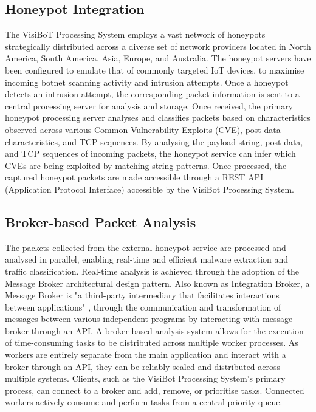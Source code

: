 \subsection{Honeypot Integration}

The VisiBoT Processing System employs a vast network of honeypots strategically distributed across a diverse set of network providers located in North America, South America, Asia, Europe, and Australia. The honeypot servers have been configured to emulate that of commonly targeted IoT devices, to maximise incoming botnet scanning activity and intrusion attempts. Once a honeypot detects an intrusion attempt, the corresponding packet information is sent to a central processing server for analysis and storage. Once received, the primary honeypot processing server analyses and classifies packets based on characteristics observed across various Common Vulnerability Exploits (CVE), post-data characteristics, and TCP sequences. By analysing the payload string, post data, and TCP sequences of incoming packets, the honeypot service can infer which CVEs are being exploited by matching string patterns. Once processed, the captured honeypot packets are made accessible through a REST API (Application Protocol Interface) accessible by the VisiBot Processing System.

\subsection{Broker-based Packet Analysis}

The packets collected from the external honeypot service are processed and analysed in parallel, enabling real-time and efficient malware extraction and traffic classification. Real-time analysis is achieved through the adoption of the Message Broker architectural design pattern. Also known as Integration Broker, a Message Broker is "a third-party intermediary that facilitates interactions between applications" \citep{IBDefinition}, through the communication and transformation of messages between various independent programs by interacting with message broker through an API. A broker-based analysis system allows for the execution of time-consuming tasks to be distributed across multiple worker processes. As workers are entirely separate from the main application and interact with a broker through an API, they can be reliably scaled and distributed across multiple systems. Clients, such as the VisiBot Processing System's primary process, can connect to a broker and add, remove, or prioritise tasks. Connected workers actively consume and perform tasks from a central priority queue. 

